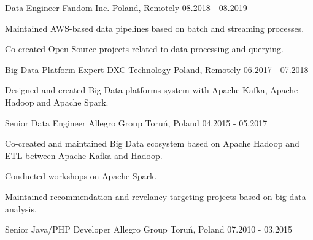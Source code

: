 \begin{cventries}
  \cventry
    {Data Engineer} %
    {Fandom Inc.} %
    {Poland, Remotely} %
    {08.2018 - 08.2019} %
    {
      \begin{cvitems} %
        \item {Maintained AWS-based data pipelines based on batch and streaming processes.}
        \item {Co-created Open Source projects related to data processing and querying.}
      \end{cvitems}
    }

  \cventry
    {Big Data Platform Expert} %
    {DXC Technology} %
    {Poland, Remotely} %
    {06.2017 - 07.2018} %
    {
      \begin{cvitems} %
        \item {Designed and created Big Data platforms system with Apache Kafka, Apache Hadoop and Apache Spark.}
      \end{cvitems}
    }

  \cventry
    {Senior Data Engineer} %
    {Allegro Group} %
    {Toruń, Poland} %
    {04.2015 - 05.2017} %
    {
      \begin{cvitems} %
        \item {Co-created and maintained Big Data ecosystem based on Apache Hadoop and ETL between Apache Kafka and Hadoop.}
        \item {Conducted workshops on Apache Spark.}
        \item {Maintained recommendation and revelancy-targeting projects based on big data analysis.}
      \end{cvitems}
    }

  \cventry
    {Senior Java/PHP Developer} %
    {Allegro Group} %
    {Toruń, Poland} %
    {07.2010 - 03.2015} %
    {
    }

\end{cventries}
